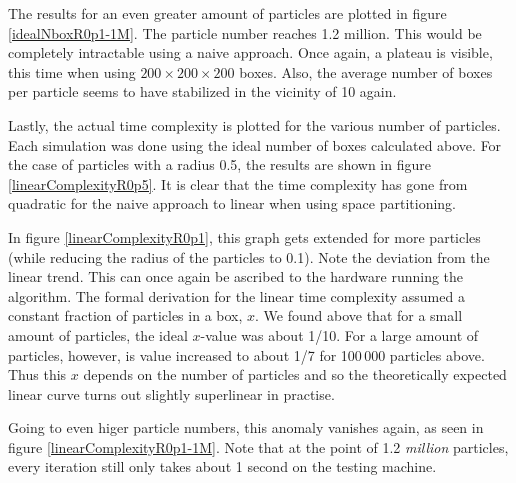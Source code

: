 The results for an even greater amount of particles are plotted in figure 
\ref{idealNboxR0p1-1M}. The particle number reaches 1.2 million. This would 
be completely intractable using a naive approach. Once again, a plateau is 
visible, this time when using $200 \times 200 \times 200$ boxes. Also, the 
average number of boxes per particle seems to have stabilized in the 
vicinity of 10 again.



Lastly, the actual time complexity is plotted for the various number of 
particles. Each simulation was done using the ideal number of boxes 
calculated above. For the case of particles with a radius 0.5, the results 
are shown in figure \ref{linearComplexityR0p5}. It is clear that the time 
complexity has gone from quadratic for the naive approach to linear when 
using space partitioning.




In figure \ref{linearComplexityR0p1}, this graph gets extended for more 
particles (while reducing the radius of the particles to 0.1). Note the 
deviation from the linear trend. This can once again be ascribed to the 
hardware running the algorithm. The formal derivation for the linear time 
complexity assumed a constant fraction of particles in a box, $x$. We found 
above that for a small amount of particles, the ideal $x$-value was about 
1/10. For a large amount of particles, however, is value increased to about 
1/7 for 100\,000 particles above. Thus this $x$ depends on the number of 
particles and so the theoretically expected linear curve turns out slightly 
superlinear in practise.

Going to even higer particle numbers, this anomaly vanishes again, as seen 
in figure \ref{linearComplexityR0p1-1M}. Note that at the point of 1.2 
\emph{million} particles, every iteration still only takes about 1 second on 
the testing machine.




